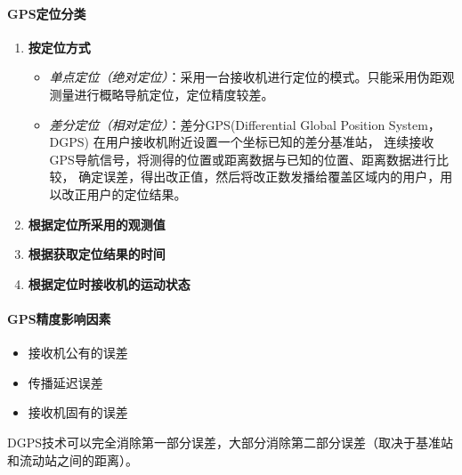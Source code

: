 \paragraph{GPS定位分类}
\begin{enumerate}
	\item \textbf{按定位方式}
		\begin{itemize}
			\item \textit{单点定位（绝对定位）}：采用一台接收机进行定位的模式。只能采用伪距观测量进行概略导航定位，定位精度较差。
			\item \textit{差分定位（相对定位）}：差分GPS(Differential Global Position System，DGPS)
				在用户接收机附近设置一个坐标已知的差分基准站， 连续接收GPS导航信号，将测得的位置或距离数据与已知的位置、距离数据进行比较，
				确定误差，得出改正值，然后将改正数发播给覆盖区域内的用户，用以改正用户的定位结果。
		\end{itemize} %
	\item \textbf{根据定位所采用的观测值} 
	\item \textbf{根据获取定位结果的时间} 
	\item \textbf{根据定位时接收机的运动状态} 
\end{enumerate}

\paragraph{GPS精度影响因素}
\begin{itemize}
	\item 接收机公有的误差
	\item 传播延迟误差
	\item 接收机固有的误差
\end{itemize}
DGPS技术可以完全消除第一部分误差，大部分消除第二部分误差（取决于基准站和流动站之间的距离）。


